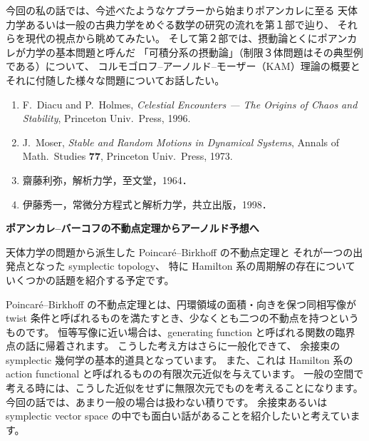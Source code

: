 \documentclass[uplatex,dvipdfmx]{jlreq}
\begin{document}
今回の私の話では、今述べたようなケプラーから始まりポアンカレに至る
天体力学あるいは一般の古典力学をめぐる数学の研究の流れを第１部で辿り、
それらを現代の視点から眺めてみたい。
そして第２部では、摂動論とくにポアンカレが力学の基本問題と呼んだ
「可積分系の摂動論」（制限３体問題はその典型例である）について、
コルモゴロフ--アーノルド--モーザー（KAM）理論の概要と
それに付随した様々な問題についてお話したい。

\bigskip


\begin{enumerate}
  \setlength{\itemsep}{2pt}
  \item F.~Diacu and P.~Holmes,
        \textit{Celestial Encounters --- The Origins of Chaos and Stability},
        Princeton Univ.\ Press, 1996.
  \item J.~Moser,
        \textit{Stable and Random Motions in Dynamical Systems},
        Annals of Math.\ Studies \textbf{77}, Princeton Univ.\ Press, 1973.
  \item 齋藤利弥，解析力学，至文堂，1964．
  \item 伊藤秀一，常微分方程式と解析力学，共立出版，1998．
\end{enumerate}

\bigskip\bigskip

\noindent
{\large\bfseries ポアンカレ--バーコフの不動点定理からアーノルド予想へ}

\medskip
\hspace*{\fill}{\large\bfseries 小野 薫（北大・理）}

\bigskip\bigskip

天体力学の問題から派生した Poincaré--Birkhoff の不動点定理と
それが一つの出発点となった symplectic topology、
特に Hamilton 系の周期解の存在についていくつかの話題を紹介する予定です。

Poincaré--Birkhoff の不動点定理とは、円環領域の面積・向きを保つ同相写像が
twist 条件と呼ばれるものを満たすとき、少なくとも二つの不動点を持つというものです。
恒等写像に近い場合は、generating function と呼ばれる関数の臨界点の話に帰着されます。
こうした考え方はさらに一般化できて、
余接束の symplectic 幾何学の基本的道具となっています。
また、これは Hamilton 系の action functional と呼ばれるものの有限次元近似を与えています。
一般の空間で考える時には、こうした近似をせずに無限次元でものを考えることになります。
今回の話では、あまり一般の場合は扱わない積りです。
余接束あるいは symplectic vector space の中でも面白い話があることを紹介したいと考えています。
\end{document}
